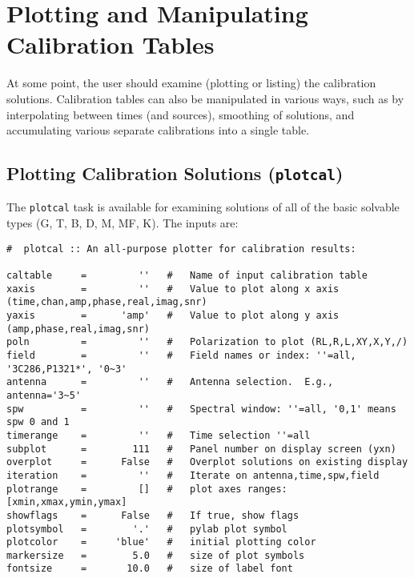 \section{Plotting and Manipulating Calibration Tables}
\label{section:cal.tables}

At some point, the user should examine (plotting or listing) the
calibration solutions.
Calibration tables can also be manipulated in various ways, such as
by interpolating between times (and sources), smoothing of solutions,
and accumulating various separate calibrations into a single 
table.

\subsection{Plotting Calibration Solutions ({\tt plotcal})}
\label{section:cal.tables.plotcal}

The {\tt plotcal} task is available for examining solutions of all of
the basic solvable types (G, T, B, D, M, MF, K).  The inputs are:
\small
\begin{verbatim}
#  plotcal :: An all-purpose plotter for calibration results:

caltable     =         ''   #   Name of input calibration table
xaxis        =         ''   #   Value to plot along x axis (time,chan,amp,phase,real,imag,snr)
yaxis        =      'amp'   #   Value to plot along y axis (amp,phase,real,imag,snr)
poln         =         ''   #   Polarization to plot (RL,R,L,XY,X,Y,/)
field        =         ''   #   Field names or index: ''=all, '3C286,P1321*', '0~3'
antenna      =         ''   #   Antenna selection.  E.g., antenna='3~5'
spw          =         ''   #   Spectral window: ''=all, '0,1' means spw 0 and 1
timerange    =         ''   #   Time selection ''=all
subplot      =        111   #   Panel number on display screen (yxn)
overplot     =      False   #   Overplot solutions on existing display
iteration    =         ''   #   Iterate on antenna,time,spw,field
plotrange    =         []   #   plot axes ranges: [xmin,xmax,ymin,ymax]
showflags    =      False   #   If true, show flags
plotsymbol   =        '.'   #   pylab plot symbol
plotcolor    =     'blue'   #   initial plotting color
markersize   =        5.0   #   size of plot symbols
fontsize     =       10.0   #   size of label font
\end{verbatim}
\normalsize

